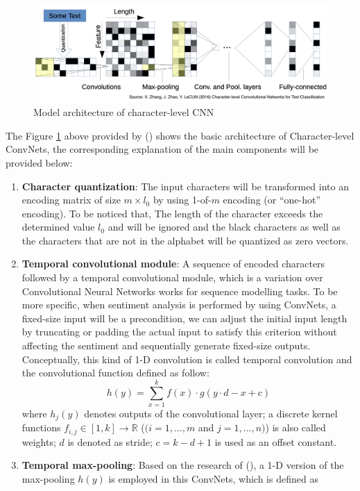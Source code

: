 \documentclass[]{krantz}
\begin{document}
\begin{figure}[ht]

{\centering \includegraphics[width=0.7\linewidth]{figures/01-03-cnns-and-their-applications-in-nlp/Character_level_CNN} 

}

\caption{\label{fig:fig_8} Model architecture of character-level CNN}\label{fig:figs-8}
\end{figure}

The Figure \ref{fig:figs-8} above provided by (\citet{Zhang2015CharacterlevelCN}) shows the basic architecture of Character-level ConvNets, the corresponding explanation of the main components will be provided below:

\begin{enumerate}
\def\labelenumi{\arabic{enumi}.}
\item
  \textbf{Character quantization}: The input characters will be transformed into an encoding matrix of size \(m \times l_0\) by using 1-of-\(m\) encoding (or ``one-hot'' encoding). To be noticed that, The length of the character exceeds the determined value \(l_0\) and will be ignored and the black characters as well as the characters that are not in the alphabet will be quantized as zero vectors.
\item
  \textbf{Temporal convolutional module}: A sequence of encoded characters followed by a temporal convolutional module, which is a variation over Convolutional Neural Networks works for sequence modelling tasks. To be more specific, when sentiment analysis is performed by using ConvNets, a fixed-size input will be a precondition, we can adjust the initial input length by truncating or padding the actual input to satisfy this criterion without affecting the sentiment and sequentially generate fixed-size outputs. Conceptually, this kind of 1-D convolution is called temporal convolution and the convolutional function defined as follow:
  \[h(y)=\sum_{x=1}^{k}f(x)\cdot g(y \cdot d -x+c)\]
  where \(h_{j}(y)\) denotes outputs of the convolutional layer; a discrete kernel functions \(f_{i,j} \in [1,k] \to \mathbb{R}\) (\((i=1,...,m\) and \(j=1,...,n)\)) is also called weights; \(d\) is denoted as stride; \(c= k-d+1\) is used as an offset constant.
\item
  \textbf{Temporal max-pooling}: Based on the research of (\citet{Boureau2010ATA}), a 1-D version of the max-pooling \(h(y)\) is employed in this ConvNets, which is defined as
\end{enumerate}
\end{document}
